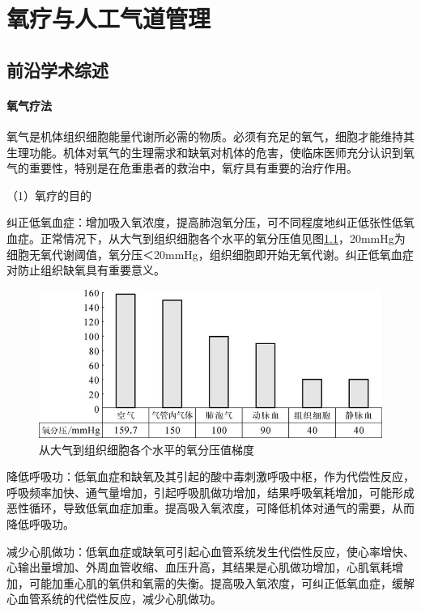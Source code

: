 \chapter{氧疗与人工气道管理}

\section{前沿学术综述}

\subsubsection{氧气疗法}

氧气是机体组织细胞能量代谢所必需的物质。必须有充足的氧气，细胞才能维持其生理功能。机体对氧气的生理需求和缺氧对机体的危害，使临床医师充分认识到氧气的重要性，特别是在危重患者的救治中，氧疗具有重要的治疗作用。

（1）氧疗的目的

纠正低氧血症：增加吸入氧浓度，提高肺泡氧分压，可不同程度地纠正低张性低氧血症。正常情况下，从大气到组织细胞各个水平的氧分压值见图\ref{fig9-1}，20mmHg为细胞无氧代谢阈值，氧分压＜20mmHg，组织细胞即开始无氧代谢。纠正低氧血症对防止组织缺氧具有重要意义。

\begin{figure}[!htbp]
 \centering
 \includegraphics{./images/Image00069.jpg}
 \captionsetup{justification=centering}
 \caption{从大气到组织细胞各个水平的氧分压值梯度}
 \label{fig9-1}
  \end{figure} 

降低呼吸功：低氧血症和缺氧及其引起的酸中毒刺激呼吸中枢，作为代偿性反应，呼吸频率加快、通气量增加，引起呼吸肌做功增加，结果呼吸氧耗增加，可能形成恶性循环，导致低氧血症加重。提高吸入氧浓度，可降低机体对通气的需要，从而降低呼吸功。

减少心肌做功：低氧血症或缺氧可引起心血管系统发生代偿性反应，使心率增快、心输出量增加、外周血管收缩、血压升高，其结果是心肌做功增加，心肌氧耗增加，可能加重心肌的氧供和氧需的失衡。提高吸入氧浓度，可纠正低氧血症，缓解心血管系统的代偿性反应，减少心肌做功。

